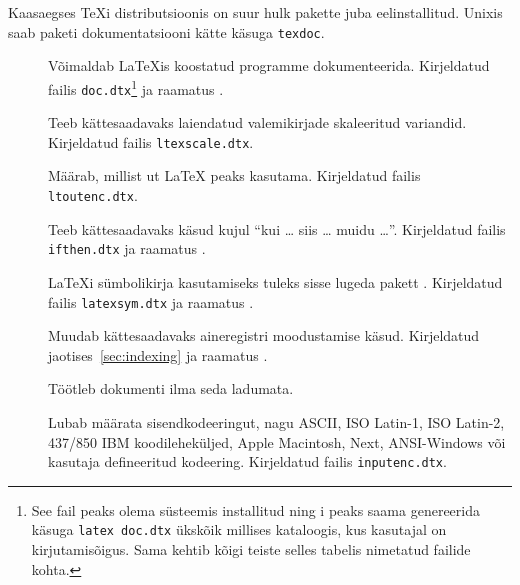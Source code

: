 {Kaasaegses \TeX i distributsioonis on suur hulk pakette juba
eelinstallitud. Unixis saab paketi dokumentatsiooni kätte käsuga
\texttt{texdoc}.

\begin{table}[tp]
\caption{Mõned \LaTeX iga kaasatulevad paketid} \label{packages}
\begin{lined}{\textwidth}
\begin{description}
\item[\normalfont{}] Võimaldab \LaTeX is koostatud programme
  dokumenteerida. Kirjeldatud failis \texttt{doc.dtx}\footnote{See
  fail peaks olema süsteemis installitud ning i
  peaks saama genereerida käsuga \texttt{latex doc.dtx} ükskõik millises
  kataloogis, kus kasutajal on kirjutamisõigus. Sama kehtib kõigi
  teiste selles tabelis nimetatud failide kohta.} ja raamatus
  \companion.

\item[\normalfont{}] Teeb kättesaadavaks laiendatud
  valemikirjade skaleeritud variandid. Kirjeldatud failis
  \texttt{ltexscale.dtx}.

\item[\normalfont{}] Määrab, millist ut
  \LaTeX{} peaks kasutama. Kirjeldatud failis \texttt{ltoutenc.dtx}.

\item[\normalfont{}] Teeb kättesaadavaks käsud kujul
  "`kui \ldots{} siis \ldots{} muidu \ldots"'. Kirjeldatud failis
  \texttt{ifthen.dtx} ja raamatus \companion.

\item[\normalfont{}] \LaTeX i sümbolikirja kasutamiseks
  tuleks sisse lugeda pakett . Kirjeldatud
  failis \texttt{latexsym.dtx} ja raamatus \companion.

\item[\normalfont{}] Muudab kättesaadavaks aineregistri
  moodustamise käsud. Kirjeldatud jaotises~\ref{sec:indexing} ja
  raamatus \companion.

\item[\normalfont{}] Töötleb dokumenti ilma seda ladumata.

\item[\normalfont{}] Lubab määrata sisendkodeeringut,
  nagu ASCII, ISO Latin-1, ISO Latin-2, 437/850 IBM koodileheküljed,
  Apple Macintosh, Next, ANSI-Windows või kasutaja defineeritud
  kodeering. Kirjeldatud failis \texttt{inputenc.dtx}.
\end{description}
\end{lined}
\end{table}

}
